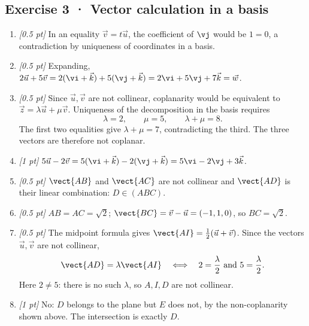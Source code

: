 \subsection*{Exercise 3 · Vector calculation in a basis}\begin{enumerate}

\item \textit{[0.5 pt]} In an equality $\vec v=t\vec u$, the coefficient of $\vj $ would be $1=0$, a contradiction by uniqueness of coordinates in a basis.

\item \textit{[0.5 pt]} Expanding, $2\vec u+5\vec v=2(\vi +\vec k)+5(\vj +\vec k)=2\vi +5\vj +7\vec k=\vec w$.

\item \textit{[0.5 pt]} Since $\vec u,\vec v$ are not collinear, coplanarity would be equivalent to $\vec z=\lambda\vec u+\mu\vec v$. Uniqueness of the decomposition in the basis requires
\[\lambda=2,\qquad\mu=5,\qquad\lambda+\mu=8.\]
The first two equalities give $\lambda+\mu=7$, contradicting the third. The three vectors are therefore not coplanar.

\item \textit{[1 pt]} $5\vec u-2\vec v=5(\vi +\vec k)-2(\vj +\vec k)=5\vi -2\vj +3\vec k$.

\item \textit{[0.5 pt]} $\vect{AB}$ and $\vect{AC}$ are not collinear and $\vect{AD}$ is their linear combination: $D\in(ABC)$.

\item \textit{[0.5 pt]} $AB=AC=\sqrt2$; $\vect{BC}=\vec v-\vec u=(-1,1,0)$, so $BC=\sqrt2$.

\item \textit{[0.5 pt]} The midpoint formula gives $\vect{AI}=\frac12(\vec u+\vec v)$. Since the vectors $\vec u,\vec v$ are not collinear,
\[\vect{AD}=\lambda\vect{AI}\quad\Longleftrightarrow\quad 2=\frac{\lambda}{2}\ \text{and}\ 5=\frac{\lambda}{2}.\]
Here $2\ne 5$: there is no such $\lambda$, so $A,I,D$ are not collinear.

\item \textit{[1 pt]} No: $D$ belongs to the plane but $E$ does not, by the non-coplanarity shown above. The intersection is exactly $D$.

\end{enumerate}

